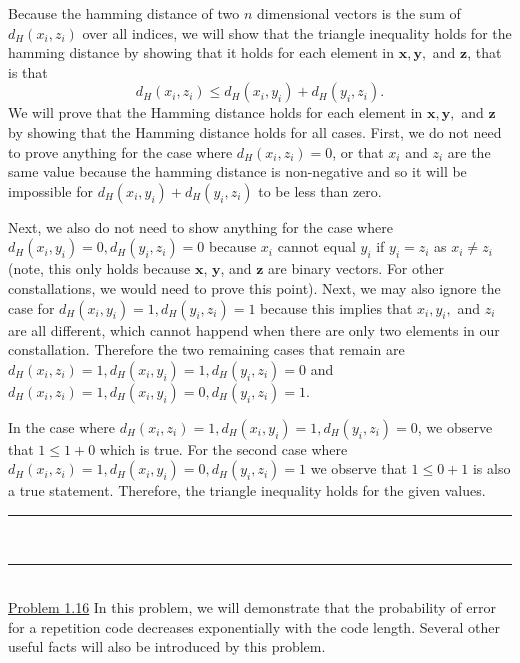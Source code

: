 \documentclass{article}
\newcommand{\problemsep}{\leavevmode\\[0.05in] \rule[\baselineskip/4]{\textwidth}{1pt} \\[0.005in] \rule[\baselineskip]{\textwidth}{1pt}\vspace{-\baselineskip}\leavevmode\\[0.05in]}
\begin{document}
Because the hamming distance of two $n$ dimensional vectors is the sum of $d_H(x_i,z_i)$ over all indices, we will show that the triangle inequality holds for the hamming distance by showing that it holds for each element in $\mathbf{x},\mathbf{y},$ and $\mathbf{z}$, that is that
\begin{equation*}
	d_H(x_i,z_i) \le d_H(x_i,y_i) + d_H(y_i,z_i).
\end{equation*} 
We will prove that the Hamming distance holds for each element in $\mathbf{x}, \mathbf{y}, $ and $\mathbf{z}$ by showing that the Hamming distance holds for all cases. First, we do not need to prove anything for the case where 
$d_H(x_i,z_i) = 0$, or that $x_i$ and $z_i$ are the same value because the hamming distance is non-negative and so it will be impossible for $d_H(x_i,y_i) + d_H(y_i,z_i)$ to be less than zero. 
\par Next, we also do not need to show anything for the case where $d_H(x_i, y_i) = 0, d_H(y_i, z_i) = 0$ because $x_i$ cannot equal $y_i$ if $y_i = z_i$ as $x_i \ne z_i$ (note, this only holds because $\mathbf{x}$, $\mathbf{y}$, and $\mathbf{z}$ are binary vectors. For other constallations, we would need to prove this point). Next, we may also ignore the case for $d_H(x_i, y_i) = 1, d_H(y_i, z_i) = 1$ because this implies that $x_i, y_i, $ and $z_i$ are all different, which cannot happend when there are only two elements in our constallation. Therefore the two remaining cases that remain are $d_H(x_i,z_i) = 1, d_H(x_i, y_i) = 1, d_H(y_i, z_i) = 0$ and $d_H(x_i, z_i) = 1, d_H(x_i, y_i) = 0, d_H(y_i, z_i) = 1$.
\par In the case where $d_H(x_i,z_i) = 1, d_H(x_i, y_i) = 1, d_H(y_i, z_i) = 0$, we observe that $1 \le 1 + 0$ which is true. For the second case where $d_H(x_i, z_i) = 1, d_H(x_i, y_i) = 0, d_H(y_i, z_i) = 1$ we observe that $1 \le 0 + 1$ is also a true statement. Therefore, the triangle inequality holds for the given values.
\problemsep
\noindent\underline{Problem 1.16}
In this problem, we will demonstrate that the probability of error for a repetition code decreases exponentially with the code length. Several other useful facts will also be introduced by this problem.
\end{document}
